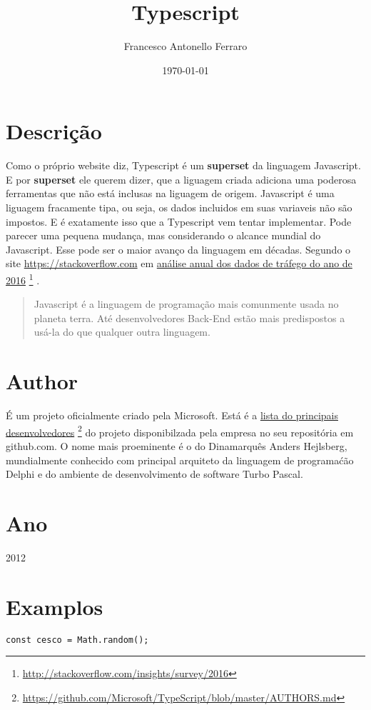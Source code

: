 \documentclass[11pt]{article}
\author{Francesco Antonello Ferraro}
\date{\today}
\title{Typescript}
\begin{document}
\maketitle
\tableofcontents

\section{Descrição}
\label{sec:org37e1ee7}

Como o próprio website diz, Typescript é um \textbf{superset} da linguagem Javascript. E por \textbf{superset} ele querem dizer, que a liguagem criada adiciona uma poderosa ferramentas que não está inclusas na liguagem de origem. Javascript é uma liguagem fracamente tipa, ou seja, os dados incluidos em suas variaveis não são impostos. E é exatamente isso que a Typescript vem tentar implementar.
Pode parecer uma pequena mudança, mas considerando o alcance mundial do Javascript. Esse pode ser o maior avanço da linguagem em décadas. Segundo o site \url{https://stackoverflow.com} em \href{http://stackoverflow.com/insights/survey/2016}{análise anual dos dados de tráfego do ano de 2016} \footnote{\url{http://stackoverflow.com/insights/survey/2016}} .
\begin{quote}
Javascript é a linguagem de programação mais comunmente usada no planeta terra. Até desenvolvedores Back-End estão mais predispostos a usá-la do que qualquer outra linguagem.
\end{quote}

\section{Author}
\label{sec:org5584de7}
É um projeto oficialmente criado pela Microsoft. Está é a \href{https://github.com/Microsoft/TypeScript/blob/master/AUTHORS.md}{lista do principais desenvolvedores}  \footnote{\url{https://github.com/Microsoft/TypeScript/blob/master/AUTHORS.md}} do projeto disponibilzada pela empresa no seu repositória em github.com.
O nome mais proeminente é o do Dinamarquês Anders Hejlsberg, mundialmente conhecido com principal arquiteto da linguagem de programaćão Delphi e do ambiente de desenvolvimento de software Turbo Pascal.

\section{Ano}
\label{sec:org77f5f92}
2012

\section{Examplos}
\label{sec:org6e20e1a}
\begin{verbatim}
const cesco = Math.random();
\end{verbatim}
\end{document}
